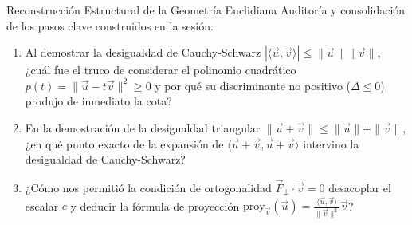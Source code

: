 \documentclass[10pt,aspectratio=169]{beamer}
\begin{document}
\begin{frame}{Reconstrucción Estructural de la Geometría Euclidiana}
  \vspace{0.15cm}
  Auditoría y consolidación de los pasos clave construidos en la sesión:
  \vspace{0.3cm}
  \begin{enumerate}\itemsep14pt
    \item Al demostrar la desigualdad de Cauchy-Schwarz $|\langle \vec{u}, \vec{v} \rangle| \le \|\vec{u}\|\|\vec{v}\|$, ¿cuál fue el truco de considerar el polinomio cuadrático $p(t) = \|\vec{u} - t\vec{v}\|^2 \ge 0$ y por qué su discriminante no positivo ($\Delta \le 0$) produjo de inmediato la cota?
    \item En la demostración de la desigualdad triangular $\|\vec{u}+\vec{v}\| \le \|\vec{u}\| + \|\vec{v}\|$, ¿en qué punto exacto de la expansión de $\langle \vec{u}+\vec{v}, \vec{u}+\vec{v} \rangle$ intervino la desigualdad de Cauchy-Schwarz?
    \item ¿Cómo nos permitió la condición de ortogonalidad $\vec{F}_\perp \cdot \vec{v} = 0$ desacoplar el escalar $c$ y deducir la fórmula de proyección $\text{proy}_{\vec{v}}(\vec{u}) = \frac{\langle \vec{u},\vec{v}\rangle}{\|\vec{v}\|^2}\vec{v}$?
  \end{enumerate}
\end{frame}
\end{document}
